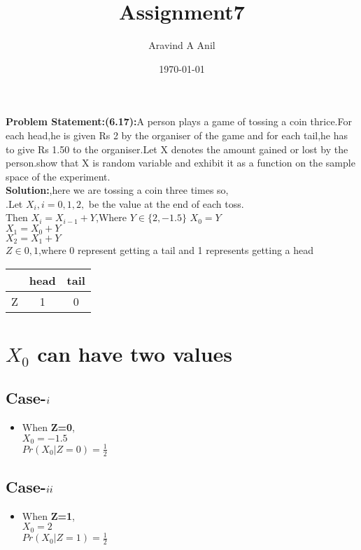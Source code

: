 \documentclass[11pt,a4paper,twocolumn]{article}
\title{Assignment7}
\author{Aravind A Anil}
\date{\today}
\begin{document}
\maketitle
\textbf{Problem Statement:(6.17):}A person plays a game of tossing a coin thrice.For each head,he is given Rs 2 by the organiser of the game and for each tail,he has to give Rs 1.50 to the organiser.Let X denotes the amount gained or lost by the person.show that X is random variable and exhibit it as a function on the sample space of the experiment.\\
\textbf{Solution:},here we are tossing a coin three times so,\\
.Let $X_i,i=0,1,2,$ be the value at the end of each toss.\\Then $X_i=X_{i-1}+Y$,Where $Y\in\{2,-1.5\}$ 
$X_{0}=Y$\\
$X_{1}=X_{0}+Y$\\
$X_{2}=X_{1}+Y$\\
$Z\in{0,1}$,where 0 represent getting a tail and 1 represents getting a head
\begin{table}[ht]
    \centering
    \begin{tabular}{|c|c|c|}
\hline
     &head&tail  \\
     \hline
     Z&1&0\\
     \hline
\end{tabular}
\end{table}
\section{ $X_{0}$ can have two values}
    \subsection{Case-$\romannumeral1$}
\begin{itemize}
    \item When \textbf{Z=0},\\
    $X_{0}=-1.5$\\
$Pr(X_{0}|Z=0)=\frac{1}{2}$
\end{itemize}
\subsection{Case-$\romannumeral2$}
\begin{itemize}
    \item When \textbf{Z=1},\\
    $X_{0}=2$\\
    $Pr(X_{0}|Z=1)=\frac{1}{2}$
\end{itemize}
\end{document}
